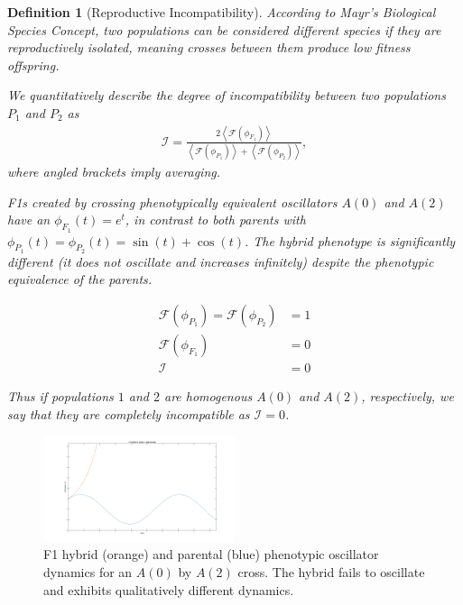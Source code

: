 \documentclass[9 pt]{article}
\newcommand{\1}{\mathbbm{1}}
\newtheorem{definition}{Definition}
\newtheorem{example}{Example}
\begin{document}
      \begin{definition}[Reproductive Incompatibility]
        According to Mayr's \emph{Biological Species Concept}, two populations can be considered different species if they are reproductively isolated, meaning crosses between them produce low fitness offspring.
        
        We quantitatively describe the degree of incompatibility between two populations $P_{1}$ and $P_{2}$ as
        \begin{align*}
          \mathcal{I} = \frac{2 \left\langle \mathcal{F} \left(\phi_{F_{1}}\right) \right\rangle}{\left\langle \mathcal{F} \left(\phi_{P_{1}}\right) \right\rangle +  \left\langle \mathcal{F} \left(\phi_{P_{2}}\right) \right\rangle} ,
        \end{align*}
        where angled brackets imply averaging. 

        F1s created by crossing phenotypically equivalent oscillators $A(0)$ and $A(2)$ have an $\phi_{F_{1}}(t) = e^{t}$, in contrast to both parents with $\phi_{P_{1}}(t) = \phi_{P_{2}}(t) = \sin(t) + \cos(t)$. The hybrid phenotype is significantly different (it does not oscillate and increases infinitely) despite the phenotypic equivalence of the parents.

        \begin{align*}
          \mathcal{F} \left(\phi_{P_{1}}\right) = \mathcal{F} \left( \phi_{P_{2}} \right) &= 1 \\
          \mathcal{F}\left(\phi_{F_{1}}\right) &= 0 \\
          \mathcal{I} &= 0
        \end{align*}

        Thus if populations $1$ and $2$ are homogenous $A(0)$ and $A(2)$, respectively, we say that they are completely incompatible as $\mathcal{I} = 0$.
      \end{definition}
      \begin{figure}[H]
        \centering
        \includegraphics[width=0.5\textwidth, height=0.25\paperheight]{expF1}
        \caption{F1 hybrid (orange) and parental (blue) phenotypic oscillator dynamics for an $A(0)$ by $A(2)$ cross. The hybrid fails to oscillate and exhibits qualitatively different dynamics.}
      \end{figure}
\end{document}
